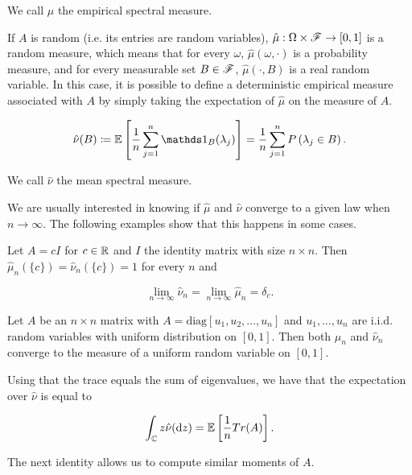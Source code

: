 We call $\hat\mu$ the empirical spectral measure. 

If $A$ is random (i.e. its entries are random variables), $\hat\mu:\Omega \times \mathscr F \to [0,1]$ is a random measure, which means that for every $\omega$, $\hat\mu(\omega, \cdot)$ is a probability measure, and for every measurable set $B\in\mathscr F$, $\hat\mu(\cdot,B)$ is a real random variable. In this case, it is possible to define a deterministic empirical measure associated with $A$ by simply taking the expectation of $\hat\mu$ on the measure of $A$.

\begin{equation*}
    \hat\nu(B) \coloneqq \E{ \frac1n \sum_{j=1}^n \mathds 1_B(\lambda_j) } = \frac1n \sum_{j=1}^n \P{\lambda_j \in B}.
\end{equation*}

We call $\hat\nu$ the mean spectral measure. 

We are usually interested in knowing if $\hat\mu$ and $\hat \nu$ converge to a given law when $n\to\infty$. The following examples show that this happens in some cases.

\begin{example} 
Let $A= c I$ for $c \in \mathbb R$ and $I$ the identity matrix with size $n\times n$. Then $\hat{\mu}_n(\{c\}) = \hat{\nu}_n(\{c\}) = 1$ for every $n$ and 

\begin{equation*}
    \lim_{n\to\infty} \hat{\nu}_n = \lim_{n\to\infty} \hat{\mu}_n = \delta_c.
\end{equation*}
\end{example}

\begin{example}
    Let $A$ be an $n \times n$ matrix with $A = \mathrm{diag}[u_1, u_2, \dots, u_n]$ and $u_1, \dots, u_n$ are i.i.d. random variables with uniform distribution on $[0,1]$. Then both $\hat \mu_n$ and $\hat \nu_n$ converge to the measure of a uniform random variable on $[0,1]$.
\end{example}

Using that the trace equals the sum of eigenvalues, we have that the expectation over  $\hat\nu$ is equal to

\begin{equation*}
    \int_\mathbb C z \hat\nu(\mathrm d z) = \mathbb E \left[  \frac1n Tr(A)  \right].
\end{equation*}

The next identity allows us to compute similar moments of $A$.

